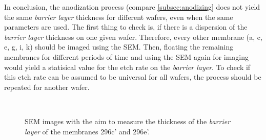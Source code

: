 \documentclass[../thesis.tex]{subfiles}
\begin{document}
          In conclusion, the anodization process (compare \cref{subsec:anodizing} does not yield the same \textit{barrier layer} thickness for different wafers, even when the same parameters are used. The first thing to check is, if there is a dispersion of the \textit{barrier layer} thickness on one given wafer. Therefore, every other membrane (a, c, e, g, i, k) should be imaged using the SEM. Then, floating the remaining membranes for different periods of time and using the SEM again for imaging would yield a statisical value for the etch rate on the \textit{barrier layer}. To check if this etch rate can be assumed to be universal for all wafers, the process should be repeated for another wafer.

          \begin{figure}[p]
            \centering
             \\
            \caption{SEM images with the aim to measure the thickness of the \textit{barrier layer} of the membranes 296c' and 296e'.}
            \label{fig:barrier-layer-sems}
          \end{figure}
\end{document}

